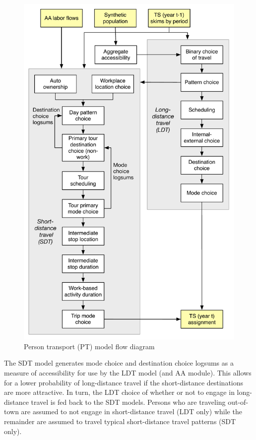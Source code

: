 \begin{figure}[!b]
\centering
\includegraphics[scale=0.65]{pt/ptmodel}
\caption{Person transport (PT) model flow diagram}\label{fig:ptmodel}
\end{figure}

The SDT model generates mode choice and destination choice logsums as a measure of accessibility for use by the LDT model (and AA module). This allows for a lower probability of long-distance travel if the short-distance destinations are more attractive. In turn, the LDT choice of whether or not to engage in long-distance travel is fed back to the SDT models. Persons who are traveling out-of-town are assumed to not engage in short-distance travel (LDT only) while the remainder are assumed to travel typical short-distance travel patterns (SDT only). 


